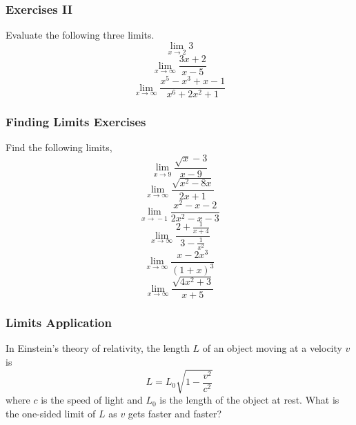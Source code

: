 \documentclass[xcolor=dvipsnames]{beamer}
\begin{document}
\begin{frame}
  \frametitle{Exercises II}
Evaluate the following three limits.
\begin{equation}
  \label{eq:haeceema}
  \lim_{x\rightarrow{}2}3
\end{equation}
\begin{equation}
  \label{eq:aogedish}
  \lim_{x\rightarrow\infty}\frac{3x+2}{x-5}
\end{equation}
\begin{equation}
  \label{eq:xaebiaph}
  \lim_{x\rightarrow\infty}\frac{x^{5}-x^{3}+x-1}{x^{6}+2x^{2}+1}
\end{equation}
\end{frame}

\begin{frame}
  \frametitle{Finding Limits Exercises}
Find the following limits,
\begin{equation}
  \label{eq:ixahngoo}
\lim_{x\rightarrow{}9}\frac{\sqrt{x}-3}{x-9}
\end{equation}
\begin{equation}
  \label{eq:etheshoh}
\lim_{x\rightarrow\infty}\frac{\sqrt{x^{2}-8x}}{2x+1}
\end{equation}
\begin{equation}
  \label{eq:chahgaew}
\lim_{x\rightarrow{}-1}\frac{x^{2}-x-2}{2x^{2}-x-3}
\end{equation}
\begin{equation}
  \label{eq:oofeegae}
\lim_{x\rightarrow\infty}\frac{2+\frac{1}{x+4}}{3-\frac{1}{x^{2}}}
\end{equation}
\begin{equation}
  \label{eq:yupeethi}
\lim_{x\rightarrow\infty}\frac{x-2x^{3}}{(1+x)^{3}}
\end{equation}
\begin{equation}
  \label{eq:reibaize}
\lim_{x\rightarrow\infty}\frac{\sqrt{4x^{2}+3}}{x+5}
\end{equation}
\end{frame}

\begin{frame}
  \frametitle{Limits Application}
In Einstein's theory of relativity, the length $L$ of an object moving
at a velocity $v$ is 
\begin{equation}
  \label{eq:aumiepha}
L=L_{0}\sqrt{1-\frac{v^{2}}{c^{2}}}
\end{equation}
where $c$ is the speed of light and $L_{0}$ is the length of the
object at rest. What is the one-sided limit of $L$ as $v$ gets
faster and faster?
\end{frame}
\end{document}
